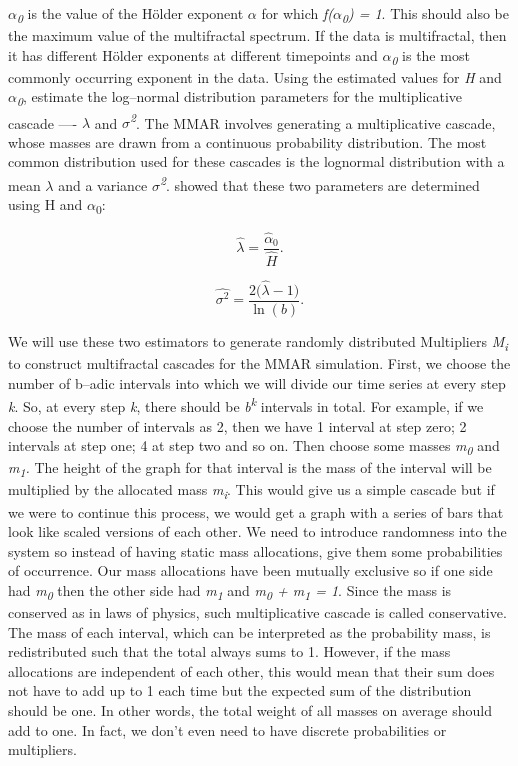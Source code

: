 \documentclass[12pt,a4paper]{report}
\numberwithin{equation}{section}
\begin{document}
\emph{$\alpha$\textsubscript{0}} is the value of the H\"older exponent $\alpha$ for
which \emph{f($\alpha$\textsubscript{0}) = 1}. This should also be the maximum
value of the multifractal spectrum. If the data is multifractal, then it
has different H\"older exponents at different timepoints and
\emph{$\alpha$\textsubscript{0}} is the most commonly occurring exponent in the
data. Using the estimated values for \emph{H} and
\emph{$\alpha$\textsubscript{0}}, estimate the log--normal distribution
parameters for the multiplicative cascade ---- \emph{$\lambda$} and
\emph{$\sigma$\textsuperscript{2}}. The MMAR involves generating a
multiplicative cascade, whose masses are drawn from a continuous
probability distribution. The most common distribution used for these
cascades is the lognormal distribution with a mean \emph{$\lambda$} and a
variance \emph{$\sigma$\textsuperscript{2}}. \cite{mandelbrot1997multifractal_13} showed that these two
parameters are determined using H and $\alpha$\textsubscript{0}:

\begin{equation}\label{eq:3.1.12}
\widehat{\lambda}=\frac{\widehat{\alpha}_0}{\widehat{H}} .
\end{equation}

\begin{equation}\label{eq:3.1.13}
\widehat{\sigma^{2}}
=\frac{2\bigl(\widehat{\lambda}-1\bigr)}{\ln(b)} .
\end{equation}


We will use these two estimators to generate randomly distributed
Multipliers \emph{M\textsubscript{i}} to construct multifractal cascades
for the MMAR simulation. First, we choose the number of b--adic intervals
into which we will divide our time series at every step \emph{k}. So, at
every step \emph{k}, there should be \emph{b\textsuperscript{k}}
intervals in total. For example, if we choose the number of intervals as
2, then we have 1 interval at step zero; 2 intervals at step one; 4 at
step two and so on. Then choose some masses \emph{m\textsubscript{0}}
and \emph{m\textsubscript{1}.} The height of the graph for that interval
is the mass of the interval will be multiplied by the allocated mass
\emph{m\textsubscript{i}}. This would give us a simple cascade but if we
were to continue this process, we would get a graph with a series of
bars that look like scaled versions of each other. We need to introduce
randomness into the system so instead of having static mass allocations,
give them some probabilities of occurrence. Our mass allocations have
been mutually exclusive so if one side had \emph{m\textsubscript{0}}
then the other side had \emph{m\textsubscript{1}} and
\emph{m\textsubscript{0} + m\textsubscript{1} = 1}. Since the mass is
conserved as in laws of physics, such multiplicative cascade is called
conservative. The mass of each interval, which can be interpreted as the
probability mass, is redistributed such that the total always sums to 1.
However, if the mass allocations are independent of each other, this
would mean that their sum does not have to add up to 1 each time but the
expected sum of the distribution should be one. In other words, the
total weight of all masses on average should add to one. In fact, we
don't even need to have discrete probabilities or multipliers.
\end{document}
